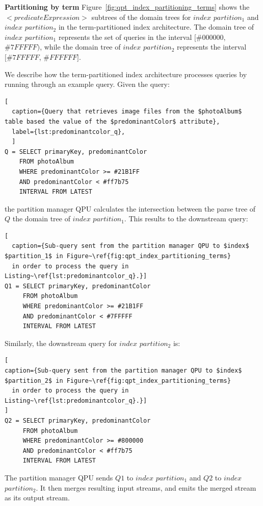 \medskip
\noindent
\textbf{Partitioning by term}
Figure~\ref{fig:qpt_index_partitioning_terms} shows the $<predicateExpression>$ subtrees of the domain trees
for $index$ $partition_1$ and $index$ $partition_2$ in the term-partitioned index architecture.
The domain tree of $index$ $partition_1$ represents the set of queries in the interval $[\#000000$, $\#7FFFFF)$,
while the domain tree of $index$ $partition_2$ represents the interval $[\#7FFFFF$, $\#FFFFFF]$.

We describe how the term-partitioned index architecture processes queries by running through an example query.
Given the query:

\begin{lstlisting}[
  caption={Query that retrieves image files from the $photoAlbum$ table based the value of the $predominantColor$ attribute},
  label={lst:predominantcolor_q},
  ]
Q = SELECT primaryKey, predominantColor
    FROM photoAlbum
    WHERE predominantColor >= #21B1FF
    AND predominantColor < #ff7b75
    INTERVAL FROM LATEST
\end{lstlisting}

\noindent
the partition manager QPU calculates the intersection between the parse tree of $Q$ the domain tree of $index$ $partition_1$.
This results to the downstream query:

\begin{lstlisting}[
  caption={Sub-query sent from the partition manager QPU to $index$ $partition_1$ in Figure~\ref{fig:qpt_index_partitioning_terms}
  in order to process the query in Listing~\ref{lst:predominantcolor_q}.}]
Q1 = SELECT primaryKey, predominantColor
     FROM photoAlbum
     WHERE predominantColor >= #21B1FF
     AND predominantColor < #7FFFFF
     INTERVAL FROM LATEST
\end{lstlisting}

\noindent
Similarly, the downstream query for $index$ $partition_2$ is:

\begin{lstlisting}[
caption={Sub-query sent from the partition manager QPU to $index$ $partition_2$ in Figure~\ref{fig:qpt_index_partitioning_terms}
  in order to process the query in Listing~\ref{lst:predominantcolor_q}.}]
]
Q2 = SELECT primaryKey, predominantColor
     FROM photoAlbum
     WHERE predominantColor >= #800000
     AND predominantColor < #ff7b75
     INTERVAL FROM LATEST
\end{lstlisting}

\noindent
The partition manager QPU sends $Q1$ to $index$ $partition_1$ and $Q2$ to $index$ $partition_2$.
It then merges resulting input streams, and emits the merged stream as its output stream.

